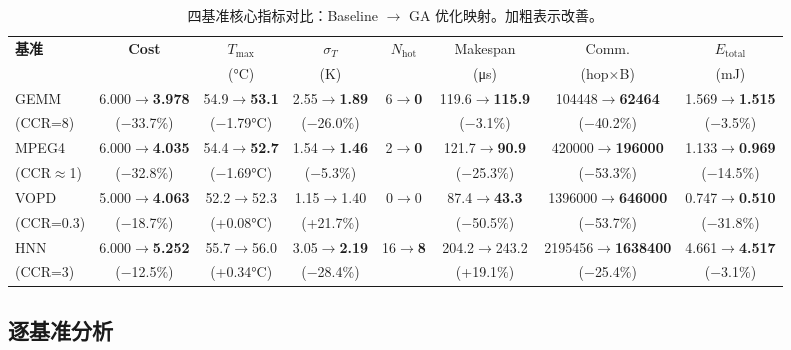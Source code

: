 \documentclass[conference]{IEEEtran}
\begin{document}
\begin{table}[t]
\centering
\caption{四基准核心指标对比：Baseline $\rightarrow$ GA 优化映射。加粗表示改善。}
\label{tab:all}
\begin{tabular}{lccccccc}
\toprule
\textbf{基准} & \textbf{Cost} & $T_{\max}$ & $\sigma_T$ & $N_{\text{hot}}$ & Makespan & Comm. & $E_{\text{total}}$ \\
 & & (\si{\degreeCelsius}) & (K) & & (\si{\micro\second}) & (hop$\times$B) & (\si{\milli\joule}) \\
\midrule
GEMM   & 6.000$\rightarrow$\textbf{3.978} & 54.9$\rightarrow$\textbf{53.1} & 2.55$\rightarrow$\textbf{1.89} & 6$\rightarrow$\textbf{0} & 119.6$\rightarrow$\textbf{115.9} & 104448$\rightarrow$\textbf{62464} & 1.569$\rightarrow$\textbf{1.515} \\
(CCR=8) & ($-$33.7\%) & ($-$1.79\si{\degreeCelsius}) & ($-$26.0\%) & & ($-$3.1\%) & ($-$40.2\%) & ($-$3.5\%) \\
\midrule
MPEG4  & 6.000$\rightarrow$\textbf{4.035} & 54.4$\rightarrow$\textbf{52.7} & 1.54$\rightarrow$\textbf{1.46} & 2$\rightarrow$\textbf{0} & 121.7$\rightarrow$\textbf{90.9} & 420000$\rightarrow$\textbf{196000} & 1.133$\rightarrow$\textbf{0.969} \\
(CCR$\approx$1) & ($-$32.8\%) & ($-$1.69\si{\degreeCelsius}) & ($-$5.3\%) & & ($-$25.3\%) & ($-$53.3\%) & ($-$14.5\%) \\
\midrule
VOPD   & 5.000$\rightarrow$\textbf{4.063} & 52.2$\rightarrow$52.3 & 1.15$\rightarrow$1.40 & 0$\rightarrow$0 & 87.4$\rightarrow$\textbf{43.3} & 1396000$\rightarrow$\textbf{646000} & 0.747$\rightarrow$\textbf{0.510} \\
(CCR=0.3) & ($-$18.7\%) & (+0.08\si{\degreeCelsius}) & (+21.7\%) & & ($-$50.5\%) & ($-$53.7\%) & ($-$31.8\%) \\
\midrule
HNN    & 6.000$\rightarrow$\textbf{5.252} & 55.7$\rightarrow$56.0 & 3.05$\rightarrow$\textbf{2.19} & 16$\rightarrow$\textbf{8} & 204.2$\rightarrow$243.2 & 2195456$\rightarrow$\textbf{1638400} & 4.661$\rightarrow$\textbf{4.517} \\
(CCR=3) & ($-$12.5\%) & (+0.34\si{\degreeCelsius}) & ($-$28.4\%) & & (+19.1\%) & ($-$25.4\%) & ($-$3.1\%) \\
\midrule
\bottomrule
\end{tabular}
\end{table}

\subsection{逐基准分析}
\end{document}
